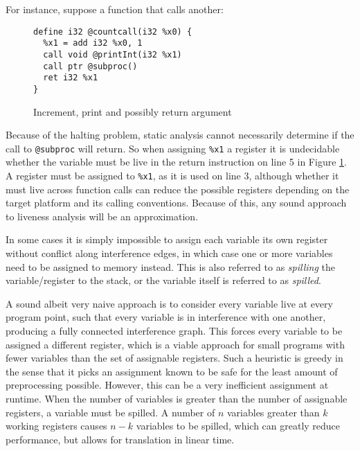 \documentclass{article}
\begin{document}
For instance, suppose a function that calls another:

\begin{figure}[h]
\begin{verbatim}
define i32 @countcall(i32 %x0) {
  %x1 = add i32 %x0, 1
  call void @printInt(i32 %x1)
  call ptr @subproc()
  ret i32 %x1
}
\end{verbatim}

\caption{\label{fig:undecidable}Increment, print and possibly return argument}
\end{figure}
\noindent Because of the halting problem, static analysis cannot necessarily determine if the call to \lstinline!@subproc! will return.  %
So when assigning \lstinline!%x1! a register it is undecidable whether the variable must be live in the return instruction on line 5 in Figure \ref{fig:undecidable}.
A register must be assigned to \texttt{\%x1}, as it is used on line 3, although whether it must live across function calls can reduce the possible registers depending on the target platform and its calling conventions. %
Because of this, any sound approach to liveness analysis will be an approximation.


In some cases it is simply impossible to assign each variable its own register without conflict along interference edges, in which case one or more variables need to be assigned to memory instead. This is also referred to as \textit{spilling} the variable/register to the stack, or the variable itself is referred to as \textit{spilled}.


A sound albeit very naive approach is to consider every variable live at every program point, such that every variable is in interference with one another, producing a fully connected interference graph.
This forces every variable to be assigned a different register, which is a viable approach for small programs with fewer variables than the set of assignable registers.
Such a heuristic is greedy in the sense that it picks an assignment known to be safe for the least amount of preprocessing possible. However, this can be a very inefficient assignment at runtime. 
When the number of variables is greater than the number of assignable registers, a variable must be spilled. A number of \(n\)  variables greater than \(k\) working registers causes \(n-k\) variables to be spilled, %
which can greatly reduce performance, but  allows for translation in linear time. %
\end{document}
